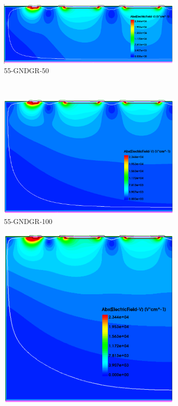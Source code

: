 \begin{figure}[htbp]
\begin{subfigure}[b]{0.5\textwidth}
    \includegraphics[width=\textwidth]{figures/ActiveEdge/Efield_55_GNDGR.png}
    \caption{55-GNDGR-50}
  \end{subfigure} \\
  \begin{subfigure}[b]{0.5\textwidth}
    \includegraphics[width=\textwidth]{figures/ActiveEdge/Efield_55_GNDGR_100.png}
    \caption{55-GNDGR-100}
  \end{subfigure}\hfill
  \begin{subfigure}[b]{0.5\textwidth}
    \includegraphics[width=\textwidth]{figures/ActiveEdge/Efield_55_GNDGR_150.png}

\end{subfigure}
\end{figure}

